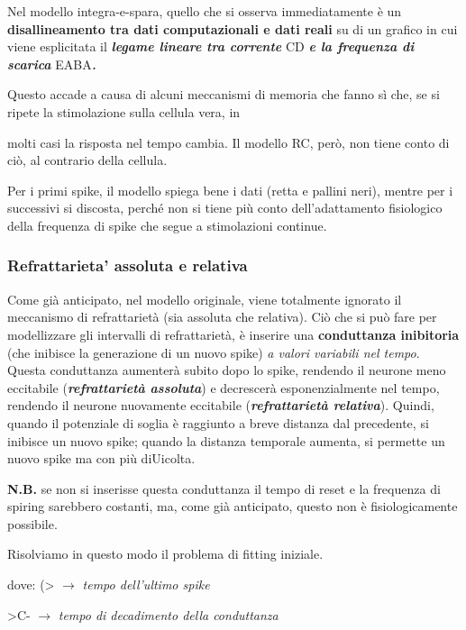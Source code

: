\documentclass[12pt,a4paper,openany]{book}
\begin{document}
Nel modello integra-e-spara, quello che si osserva immediatamente è un \textbf{disallineamento tra dati computazionali e dati reali }su di un grafico in cui viene esplicitata il \textbf{\textit{legame lineare tra corrente }}CD \textbf{\textit{e la frequenza di scarica }}EABA\textbf{\textit{.}}

Questo accade a causa di alcuni meccanismi di memoria che fanno sì che, se si ripete la stimolazione sulla cellula vera, in

molti casi la risposta nel tempo cambia. Il modello RC, però, non tiene conto di ciò, al contrario della cellula.

Per i primi spike, il modello spiega bene i dati (retta e pallini neri), mentre per i successivi si discosta, perché non si tiene più conto dell'adattamento fisiologico della frequenza di spike che segue a stimolazioni continue.

\subsubsection{Refrattarieta' assoluta e relativa}

Come già anticipato, nel modello originale, viene totalmente ignorato il meccanismo di refrattarietà (sia assoluta che relativa). Ciò che si può fare per modellizzare gli intervalli di refrattarietà, è inserire una \textbf{conduttanza inibitoria }(che inibisce la generazione di un nuovo spike) \textit{a valori variabili nel tempo}. Questa conduttanza aumenterà subito dopo lo spike, rendendo il neurone meno eccitabile (\textbf{\textit{refrattarietà assoluta}}) e decrescerà esponenzialmente nel tempo, rendendo il neurone nuovamente eccitabile (\textbf{\textit{refrattarietà relativa}}). Quindi, quando il potenziale di soglia è raggiunto a breve distanza dal precedente, si inibisce un nuovo spike; quando la distanza temporale aumenta, si permette un nuovo spike ma con più diUicolta.

\textbf{N.B. }se non si inserisse questa conduttanza il tempo di reset e la frequenza di spiring sarebbero costanti, ma, come già anticipato, questo non è fisiologicamente possibile.

Risolviamo in questo modo il problema di fitting iniziale.


dove: (> $\rightarrow$ \textit{tempo dell'ultimo spike}

\textit{}>C- $\rightarrow$ \textit{tempo di decadimento della conduttanza}
\end{document}
